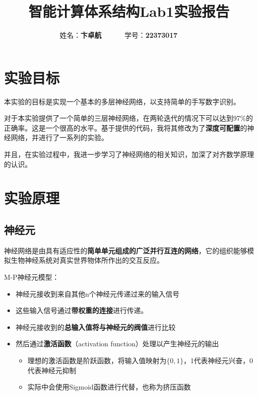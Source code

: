 \documentclass[12pt,a4paper]{article}
\begin{document}
\title{智能计算体系结构Lab1实验报告}
\date{}

\author{
姓名：\textbf{卞卓航}~~~~~~
学号：\textbf{22373017}~~~~~~
}

\maketitle

\section{实验目标}

本实验的目标是实现一个基本的多层神经网络，以支持简单的手写数字识别。

对于本实验提供了一个简单的三层神经网络，在两轮迭代的情况下可以达到97\%的正确率。这是一个很高的水平。基于提供的代码，我将其修改为了\textbf{深度可配置}的神经网络，并进行了一系列的实验。

并且，在实验过程中，我进一步学习了神经网络的相关知识，加深了对齐数学原理的认识。

\section{实验原理}

\subsection{神经元}

神经网络是由具有适应性的\textbf{简单单元组成的广泛并行互连的网络}，它的组织能够模拟生物神经系统对真实世界物体所作出的交互反应。

M-P神经元模型：

\begin{itemize}
\item
  神经元接收到来自其他n个神经元传递过来的输入信号
\item
  这些输入信号通过\textbf{带权重的连接}进行传递。
\item
  神经元接收到的\textbf{总输入值将与神经元的阀值}进行比较
\item
  然后通过\textbf{激活函数}（activation function）处理以产生神经元的输出

  \begin{itemize}
  \item
    理想的激活函数是阶跃函数，将输入值映射为$\{0,1\}$，1代表神经元兴奋，0代表神经元抑制
  \item
    实际中会使用Sigmoid函数进行代替，也称为挤压函数
  \end{itemize}
\end{itemize}
\end{document}
